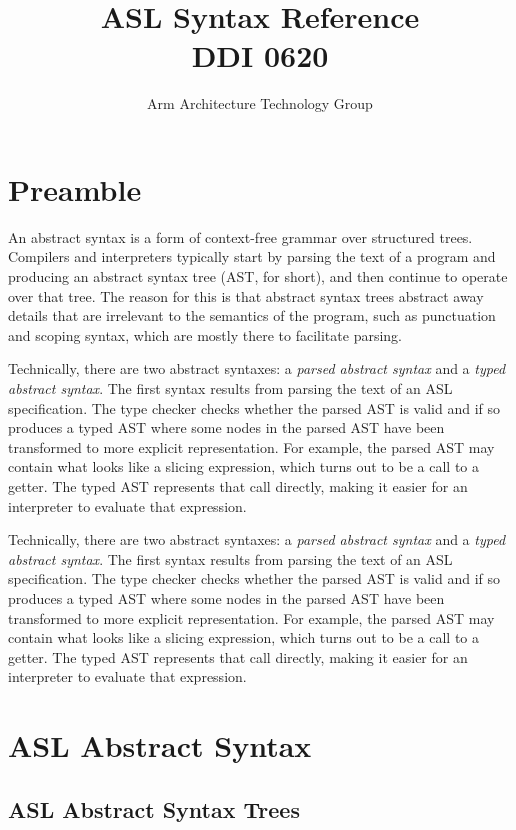 \documentclass{book}
\author{Arm Architecture Technology Group}
\title{ASL Syntax Reference \\
       DDI 0620}
\begin{document}
\maketitle

\tableofcontents{}





\chapter{Preamble}
An abstract syntax is a form of context-free grammar over structured trees. Compilers and interpreters typically start by parsing the text of a program and producing an abstract syntax tree (AST, for short), and then continue to operate over that tree.
%
The reason for this is that abstract syntax trees abstract away details that are irrelevant to the semantics of the program, such as punctuation and scoping syntax, which are mostly there to facilitate parsing.

Technically, there are two abstract syntaxes:
a \emph{parsed abstract syntax} and a \emph{typed abstract syntax}.
The first syntax results from parsing the text of an ASL specification.
The type checker checks whether the parsed AST is valid and if so produces
a typed AST where some nodes in the parsed AST have been transformed to
more explicit representation. For example, the parsed AST may contain
what looks like a slicing expression, which turns out to be a call to a getter.
The typed AST represents that call directly, making it easier for an interpreter
to evaluate that expression.

Technically, there are two abstract syntaxes:
a \emph{parsed abstract syntax} and a \emph{typed abstract syntax}.
The first syntax results from parsing the text of an ASL specification.
The type checker checks whether the parsed AST is valid and if so produces
a typed AST where some nodes in the parsed AST have been transformed to
more explicit representation. For example, the parsed AST may contain
what looks like a slicing expression, which turns out to be a call to a getter.
The typed AST represents that call directly, making it easier for an interpreter
to evaluate that expression.

\chapter{ASL Abstract Syntax}

\section{ASL Abstract Syntax Trees}
\end{document}
